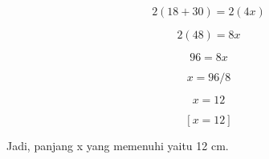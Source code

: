 \documentclass{article}
\begin{document}
\begin{eulernotebook}
\begin{eulercomment}
\begin{eulercomment}
\begin{eulercomment}
\begin{eulercomment}
\begin{eulercomment}
\end{eulercomment}
\begin{eulerformula}
\[
2(18+30)=2(4x)
\]
\end{eulerformula}
\begin{eulerformula}
\[
2(48)=8x
\]
\end{eulerformula}
\begin{eulerformula}
\[
96=8x
\]
\end{eulerformula}
\begin{eulerformula}
\[
x=96/8
\]
\end{eulerformula}
\begin{eulerformula}
\[
x=12
\]
\end{eulerformula}
\begin{eulerformula}
\[
\left[ x=12 \right] 
\]
\end{eulerformula}
\begin{eulercomment}
Jadi, panjang x yang memenuhi yaitu 12 cm.


\end{eulercomment}
\end{eulercomment}
\end{eulercomment}
\end{eulercomment}
\end{eulercomment}
\end{eulernotebook}
\end{document}
